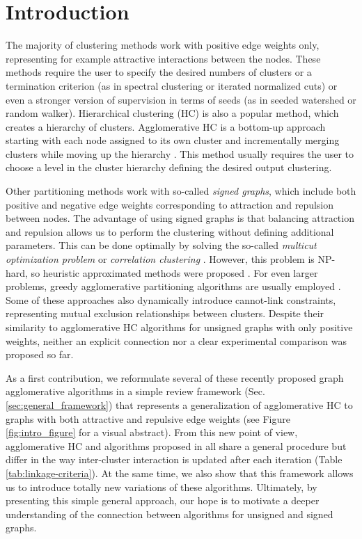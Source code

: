 
\section{Introduction}
The majority of clustering methods work with positive edge weights only, representing for example attractive interactions between the nodes. These methods require the user to specify the desired numbers of clusters or a termination criterion (as in spectral clustering or iterated normalized cuts) or even a stronger version of supervision in terms of seeds (as in seeded watershed or random walker).  
Hierarchical clustering (HC) is also a popular method, which creates a hierarchy of clusters. Agglomerative HC is a bottom-up approach starting with each node assigned to its own cluster and incrementally merging clusters while moving up the hierarchy \cite{lance1967general}. This method usually requires the user to choose a level in the cluster hierarchy defining the desired output clustering. 

Other partitioning methods work with so-called \emph{signed graphs}, which include both positive and negative edge weights corresponding to attraction and repulsion between nodes. The advantage of using signed graphs is that balancing attraction and repulsion allows us to perform the clustering without defining additional parameters. This can be done optimally by solving the so-called \emph{multicut optimization problem} or \emph{correlation clustering} \cite{kappes2011globally,chopra1991multiway}. However, this problem is NP-hard, so heuristic approximated methods were proposed \cite{yarkony2012fast,pape2017solving}. For even larger problems, greedy agglomerative partitioning algorithms are usually employed \cite{kardoostsolving,keuper2015efficient}. Some of these approaches \cite{levinkov2017comparative,wolf2018mutex} also dynamically introduce cannot-link constraints, representing mutual exclusion relationships between clusters. Despite their similarity to agglomerative HC algorithms for unsigned graphs with only positive weights, neither an explicit connection nor a clear experimental comparison was proposed so far.

As a first contribution, we reformulate several of these recently proposed graph agglomerative algorithms in a simple review framework (Sec. \ref{sec:general_framework}) that represents a generalization of agglomerative HC to graphs with both attractive and repulsive edge weights (see Figure \ref{fig:intro_figure} for a visual abstract). From this new point of view, agglomerative HC and algorithms proposed in \cite{levinkov2017comparative,wolf2018mutex,lance1967general,kardoostsolving} all share a general procedure but differ in the way inter-cluster interaction is updated after each iteration (Table \ref{tab:linkage-criteria}). At the same time, we also show that this framework allows us to introduce totally new variations of these algorithms. 
Ultimately, by presenting this simple general approach, our hope is to motivate a deeper understanding of the connection between algorithms for unsigned and signed graphs.

